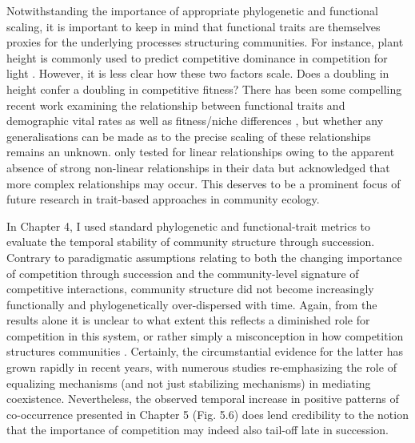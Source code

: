 Notwithstanding the importance of appropriate phylogenetic and functional scaling, it is important to keep in mind that functional traits are themselves proxies for the underlying processes structuring communities. For instance, plant height is commonly used to predict competitive dominance in competition for light \citep{Westoby2002, McGill2006}. However, it is less clear how these two factors scale. Does a doubling in height confer a doubling in competitive fitness? There has been some compelling recent work examining the relationship between functional traits and demographic vital rates \citep{Adler2013} as well as fitness/niche differences \citep{Kraft2014}, but whether any generalisations can be made as to the precise scaling of these relationships remains an unknown. \citet{Kraft2015} only tested for linear relationships owing to the apparent absence of strong non-linear relationships in their data but acknowledged that more complex relationships may occur. This deserves to be a prominent focus of future research in trait-based approaches in community ecology. 

In Chapter 4, I used standard phylogenetic and functional-trait metrics to evaluate the temporal stability of community structure through succession. Contrary to paradigmatic assumptions relating to both the changing importance of competition through succession and the community-level signature of competitive interactions, community structure did not become increasingly functionally and phylogenetically over-dispersed with time. Again, from the results alone it is unclear to what extent this reflects a diminished role for competition in this system, or rather simply a misconception in how competition structures communities \citep[\textit{sensu}][]{Mayfield2010}. Certainly, the circumstantial evidence for the latter has grown rapidly in recent years, with numerous studies re-emphasizing the role of equalizing mechanisms (and not just stabilizing mechanisms) in mediating coexistence. Nevertheless, the observed temporal increase in positive patterns of co-occurrence presented in Chapter 5 (Fig. 5.6) does lend credibility to the notion that the importance of competition may indeed also tail-off late in succession. 

